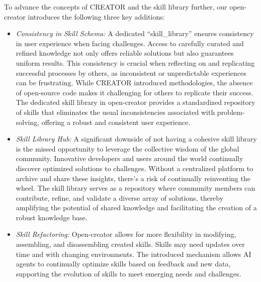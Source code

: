 To advance the concepts of CREATOR and the skill library further, our open-creator introduces the following three key additions:

\begin{itemize}
    \item \textit{Consistency in Skill Schema:} A dedicated “skill\_library” ensures consistency in user experience when facing challenges. Access to carefully curated and refined knowledge not only offers reliable solutions but also guarantees uniform results. This consistency is crucial when reflecting on and replicating successful processes by others, as inconsistent or unpredictable experiences can be frustrating. While CREATOR introduced methodologies, the absence of open-source code makes it challenging for others to replicate their success. The dedicated skill library in open-creator provides a standardized repository of skills that eliminates the usual inconsistencies associated with problem-solving, offering a robust and consistent user experience.
    \item \textit{Skill Library Hub:} A significant downside of not having a cohesive skill library is the missed opportunity to leverage the collective wisdom of the global community. Innovative developers and users around the world continually discover optimized solutions to challenges. Without a centralized platform to archive and share these insights, there's a risk of continually reinventing the wheel. The skill library serves as a repository where community members can contribute, refine, and validate a diverse array of solutions, thereby amplifying the potential of shared knowledge and facilitating the creation of a robust knowledge base.
    \item \textit{Skill Refactoring:} Open-creator allows for more flexibility in modifying, assembling, and disassembling created skills. Skills may need updates over time and with changing environments. The introduced mechanism allows AI agents to continually optimize skills based on feedback and new data, supporting the evolution of skills to meet emerging needs and challenges.
\end{itemize}

